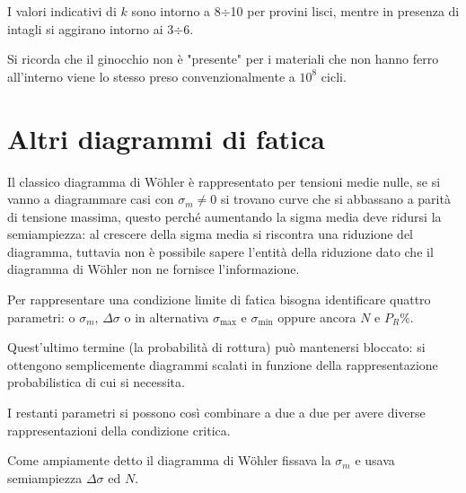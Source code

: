 			I valori indicativi di $k$ sono intorno a 8$\div$10 per provini lisci, mentre in presenza di intagli si aggirano intorno ai 3$\div$6. \newline
			
			Si ricorda che il ginocchio non è "presente" per i materiali che non hanno ferro all'interno viene lo stesso preso convenzionalmente a $10^8$ cicli. 
			
\section{Altri diagrammi di fatica}			
			Il classico diagramma di Wöhler è rappresentato per tensioni medie nulle, se si vanno a diagrammare casi con $\sigma_m\ne0$ si trovano curve che si abbassano a parità di tensione massima, questo perché aumentando la sigma media deve ridursi la semiampiezza: al crescere della sigma media si riscontra una riduzione del diagramma, tuttavia non è possibile sapere l'entità della riduzione dato che  il diagramma di Wöhler non ne fornisce l'informazione. \newline 
			
			Per rappresentare una condizione limite di fatica bisogna identificare quattro parametri: o $\sigma_m$, $\Delta\sigma$ o in alternativa $\sigma_{\max}$ e $\sigma_{\min}$ oppure ancora $N$ e $P_R\%$. 
			
			Quest'ultimo termine (la probabilità di rottura) può mantenersi bloccato: si ottengono semplicemente diagrammi scalati in funzione della rappresentazione probabilistica di cui si necessita. 
			
			I restanti parametri si possono così combinare a due a due per avere diverse rappresentazioni della condizione critica. \newline 
			
			Come ampiamente detto il diagramma di Wöhler fissava la $\sigma_m$ e usava semiampiezza $\Delta \sigma$ ed $N$. 
			
